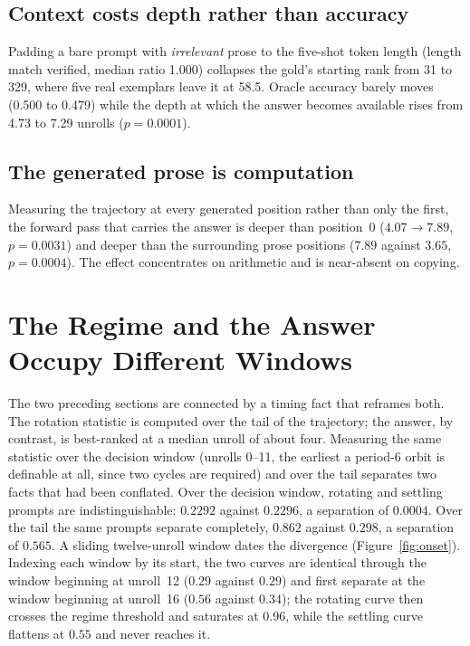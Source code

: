 \documentclass{zapiski}
\begin{document}
\subsection{Context costs depth rather than accuracy}

Padding a bare prompt with \emph{irrelevant} prose to the five-shot token length (length match
verified, median ratio 1.000) collapses the gold's starting rank from 31 to 329, where five real
exemplars leave it at 58.5. Oracle accuracy barely moves (0.500 to 0.479) while the depth at
which the answer becomes available rises from 4.73 to 7.29 unrolls ($p = 0.0001$).

\subsection{The generated prose is computation}

Measuring the trajectory at every generated position rather than only the first, the forward pass
that carries the answer is deeper than position~0 ($4.07 \rightarrow 7.89$, $p = 0.0031$) and
deeper than the surrounding prose positions ($7.89$ against $3.65$, $p = 0.0004$). The effect concentrates on arithmetic and is near-absent on copying.

\section{The Regime and the Answer Occupy Different Windows}

The two preceding sections are connected by a timing fact that reframes both. The rotation
statistic is computed over the tail of the trajectory; the answer, by contrast, is best-ranked
at a median unroll of about four. Measuring the same statistic over the decision window
(unrolls 0--11, the earliest a period-6 orbit is definable at all, since two cycles are
required) and over the tail separates two facts that had been conflated. Over the decision
window, rotating and settling prompts are indistinguishable: $0.2292$ against $0.2296$, a
separation of $0.0004$. Over the tail the same prompts separate completely, $0.862$ against
$0.298$, a separation of $0.565$. A sliding twelve-unroll window dates the divergence (Figure~\ref{fig:onset}). Indexing
each window by its start, the two curves are identical through the window beginning at
unroll~12 ($0.29$ against $0.29$) and first separate at the window beginning at unroll~16
($0.56$ against $0.34$); the rotating curve then crosses the regime threshold and saturates
at $0.96$, while the settling curve flattens at $0.55$ and never reaches it.
\end{document}
